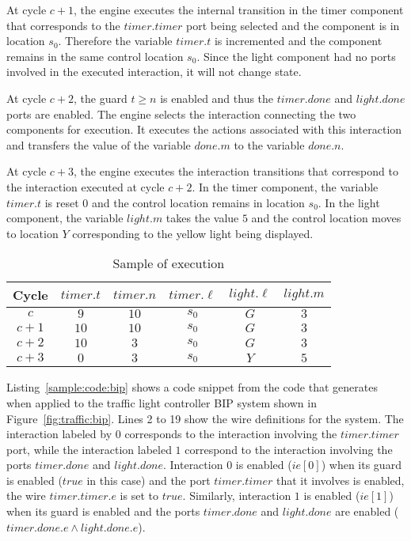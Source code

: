 At cycle $c+1$, the engine executes the internal transition in the timer component
that corresponds to the $timer.timer$ port being selected and the component is in location $s_0$. 
Therefore the variable $timer.t$ is incremented and the component 
remains in the same control location $s_0$. Since the light component
had no ports involved in the executed interaction, it will not change 
state. 

At cycle $c+2$, the guard $t \geq n$ is enabled and thus the $timer.done$ and $light.done$ ports are enabled. 
The engine selects the interaction connecting the two components
for execution. It executes the actions associated with this interaction 
and transfers the value of the variable $done.m$ to the variable $done.n$.

At cycle $c+3$, the engine executes the interaction transitions that 
correspond to the interaction executed at cycle $c+2$. In the timer 
component, the variable $timer.t$ is reset $0$ and the control location 
remains in location $s_0$. In the light component, the variable 
$light.m$ takes the value $5$ and the control location moves to location 
$Y$ corresponding to the yellow light being displayed. 

\begin{table}[bt]
\centering
\caption{Sample of \biptool{} execution}
\begin{tabular}{|c|c|c|c|c|c|}
\hline
Cycle & $timer.t$ & $timer.n$ & $timer.\ell$ & $light.\ell$ & $light.m$ \\ 
\hline
$c$ & $9$ & $10$ & $s_0$ & $G$ & $3$ \\
		\hline
		$c+1$ & $10$ & $10$ & $s_0$ & $G$ & $3$ \\
			\hline
			$c+2$ & $10$ & $3$ & $s_0$ & $G$ & $3$ \\
				\hline
	  $c+3$ & $0$ & $3$ & $s_0$ & $Y$ & $5$ \\
	  \hline
\end{tabular}
\label{tb:bip:exec}
\end{table}

Listing~\ref{sample:code:bip} shows a code snippet from the code that \biptool{} generates
when applied to the traffic light controller BIP system shown in Figure~\ref{fig:traffic:bip}.
Lines 2 to 19 show the wire definitions for the system. The interaction 
labeled by $0$ corresponds to the interaction involving the $timer.timer$
port, while the interaction labeled $1$ correspond to the interaction 
involving the ports $timer.done$ and $light.done$. 
Interaction $0$ is enabled ($ie[0]$) when its guard is enabled ($true$ 
in this case) and the port $timer.timer$ that it involves is enabled, 
\ie{} the wire $timer.timer.e$ is set to $true$. 
Similarly, interaction $1$ is enabled ($ie[1]$) when its guard is
enabled and the ports $timer.done$ and $light.done$ are enabled 
($timer.done.e \land light.done.e$).

